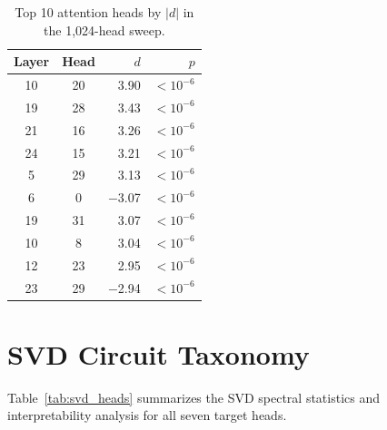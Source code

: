 \documentclass{article}
\newcommand{\dcohen}{d}
\begin{document}
\begin{table}[h]
\centering
\caption{Top 10 attention heads by $|\dcohen|$ in the 1{,}024-head sweep.}
\small
\begin{tabular}{ccrr}
\toprule
Layer & Head & $\dcohen$ & $p$ \\
\midrule
10 & 20 & 3.90 & $< 10^{-6}$ \\
19 & 28 & 3.43 & $< 10^{-6}$ \\
21 & 16 & 3.26 & $< 10^{-6}$ \\
24 & 15 & 3.21 & $< 10^{-6}$ \\
5 & 29 & 3.13 & $< 10^{-6}$ \\
6 & 0 & $-$3.07 & $< 10^{-6}$ \\
19 & 31 & 3.07 & $< 10^{-6}$ \\
10 & 8 & 3.04 & $< 10^{-6}$ \\
12 & 23 & 2.95 & $< 10^{-6}$ \\
23 & 29 & $-$2.94 & $< 10^{-6}$ \\
\bottomrule
\end{tabular}
\end{table}


\section{SVD Circuit Taxonomy}
\label{app:svd_taxonomy}

Table~\ref{tab:svd_heads} summarizes the SVD spectral statistics and interpretability analysis for all seven target heads.
\end{document}
